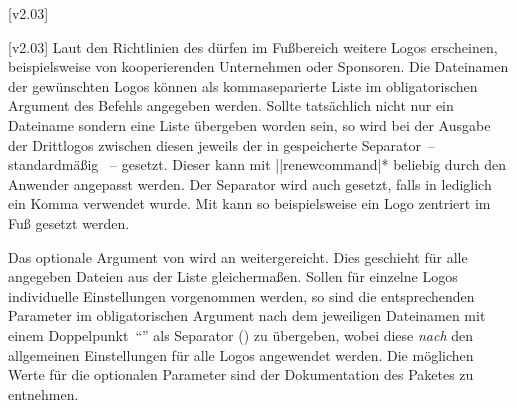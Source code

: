 \begin{DeclareEntity*}{}
\begin{DeclareEntity*}{}
\begin{DeclareEntity*}{}
\begin{Declaration}
  {}
  [v2.03]
\begin{Declaration}
  {}
  [v2.03]
%
Laut den Richtlinien des \CDs dürfen im Fußbereich weitere Logos erscheinen, 
beispielsweise von kooperierenden Unternehmen oder Sponsoren. Die Dateinamen 
der gewünschten Logos können als kommaseparierte Liste im obligatorischen 
Argument des Befehls  angegeben werden. Sollte tatsächlich 
nicht nur ein Dateiname sondern eine Liste übergeben worden sein, so wird bei 
der Ausgabe der Drittlogos zwischen diesen jeweils der in  
gespeicherte Separator~-- standardmäßig ~-- gesetzt. Dieser kann 
mit \Macro||{renewcommand|*\MPValue{\dots}} 
beliebig durch den Anwender angepasst werden. Der Separator wird auch gesetzt, 
falls in  lediglich ein Komma verwendet wurde. Mit 
 kann so beispielsweise ein 
Logo zentriert im Fuß gesetzt werden.

Das optionale Argument von  wird an  
weitergereicht. Dies geschieht für alle angegeben Dateien aus der Liste 
gleichermaßen. Sollen für einzelne Logos individuelle Einstellungen vorgenommen 
werden, so sind die entsprechenden Parameter im obligatorischen Argument nach 
dem jeweiligen Dateinamen mit einem Doppelpunkt~\enquote{\PValue{:}} als 
Separator () zu 
übergeben, wobei diese \emph{nach} den allgemeinen Einstellungen für alle Logos 
angewendet werden. Die möglichen Werte für die optionalen Parameter sind der 
Dokumentation des Paketes  zu entnehmen.
\end{Declaration}
\end{Declaration}


\end{DeclareEntity*}
\end{DeclareEntity*}
\end{DeclareEntity*}

